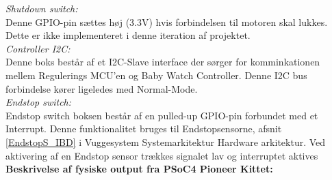 \textit{Shutdown switch:} \\ Denne GPIO-pin sættes høj (3.3V) hvis forbindelsen til motoren skal lukkes. Dette er ikke implementeret i denne iteration af projektet. \\
\textit{Controller I2C:} \\ Denne boks består af et I2C-Slave interface der sørger for komminkationen mellem Regulerings MCU'en og Baby Watch Controller. Denne I2C bus forbindelse kører ligeledes med Normal-Mode. \\ 
\textit{Endstop switch:} \\ Endstop switch boksen består af en pulled-up GPIO-pin forbundet med et Interrupt. Denne funktionalitet bruges til Endstopsensorne, afsnit \vref{EndstopS_IBD} i Vuggesystem Systemarkitektur Hardware arkitektur. Ved aktivering af en Endstop sensor trækkes signalet lav og interruptet aktives \\ 

\textbf{Beskrivelse af fysiske output fra PSoC4 Pioneer Kittet:} \\

